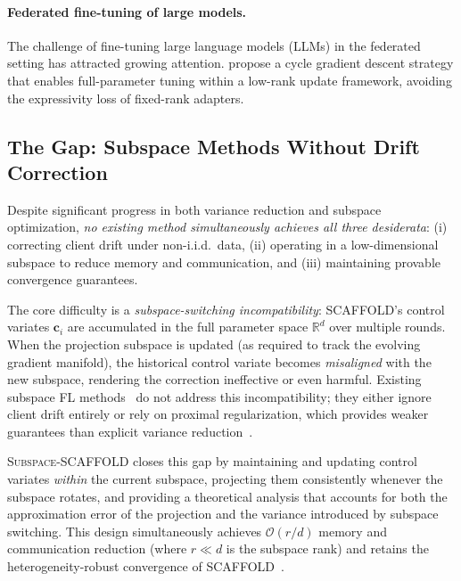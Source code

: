 \paragraph{Federated fine-tuning of large models.}
The challenge of fine-tuning large language models (LLMs) in the
federated setting has attracted growing attention.
\citet{wang2024save} propose a cycle gradient descent strategy that
enables full-parameter tuning within a low-rank update framework,
avoiding the expressivity loss of fixed-rank adapters.

\subsection{The Gap: Subspace Methods Without Drift Correction}
\label{subsec:gap}

Despite significant progress in both variance reduction and subspace
optimization, \emph{no existing method simultaneously achieves all
three desiderata}: (i) correcting client drift under non-i.i.d.\ data,
(ii) operating in a low-dimensional subspace to reduce memory and
communication, and (iii) maintaining provable convergence guarantees.

The core difficulty is a \emph{subspace-switching incompatibility}:
\textsc{SCAFFOLD}'s control variates $\mathbf{c}_i$ are accumulated
in the full parameter space $\mathbb{R}^d$ over multiple rounds.
When the projection subspace is updated (as required to track the
evolving gradient manifold), the historical control variate becomes
\emph{misaligned} with the new subspace, rendering the correction
ineffective or even harmful.
Existing subspace FL methods~\citep{zhang2025fedsub,park2024fedloru,
zhou2025ilora} do not address this incompatibility; they either ignore
client drift entirely or rely on proximal regularization, which
provides weaker guarantees than explicit variance
reduction~\citep{karimireddy2020scaffold,li2020fedprox}.

\textsc{Subspace-SCAFFOLD} closes this gap by maintaining and updating
control variates \emph{within} the current subspace, projecting them
consistently whenever the subspace rotates, and providing a theoretical
analysis that accounts for both the approximation error of the
projection and the variance introduced by subspace switching.
This design simultaneously achieves $\mathcal{O}(r/d)$ memory and
communication reduction (where $r \ll d$ is the subspace rank) and
retains the heterogeneity-robust convergence of
\textsc{SCAFFOLD}~\citep{karimireddy2020scaffold}.
